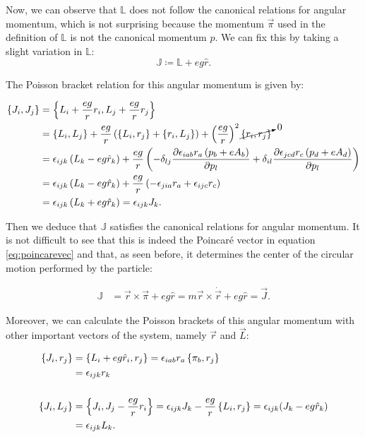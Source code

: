 Now, we can observe that $\mathbb{L}$ does not follow the canonical relations for angular momentum, which is not surprising because the momentum $\vec{\pi}$ used in the definition of $\mathbb{L}$ is not the canonical momentum $p$. We can fix this by taking a slight variation in $\mathbb{L}$:\\

\begin{equation}
\mathbb{J} \coloneqq \mathbb{L} + eg\hat{r}.
\label{eq:ham poincarevec}
\end{equation}

The Poisson bracket relation for this angular momentum is given by:

\begin{align*}
\left\lbrace J_i, J_j \right\rbrace &= \left\lbrace L_i + \frac{eg}{r}r_i, L_j + \frac{eg}{r}r_j \right\rbrace\\
&= \left\lbrace L_i, L_j \right\rbrace + \frac{eg}{r}\left( \left\lbrace L_i, r_j \right\rbrace +\left\lbrace r_i, L_j \right\rbrace \right) + \left( \frac{eg}{r} \right)^2\cancelto{0}{\left\lbrace r_i, r_j \right\rbrace}\\
& = \epsilon_{ijk}\left( L_k-{eg}\hat{r}_k \right)+\frac{eg}{r}\left( -\delta_{lj}\frac{\partial \epsilon_{iab}r_a\left( p_b+eA_b \right)}{\partial p_l}+ \delta_{il}\frac{\partial\epsilon_{jcd}r_c\left( p_d+eA_d \right)}{\partial p_l} \right)\\
& = \epsilon_{ijk}\left( L_k-{eg}\hat{r}_k \right)+ \frac{eg}{r}\left( -\epsilon_{jia}r_a+\epsilon_{ijc}r_c \right)\\
&= \epsilon_{ijk}\left( L_k+{eg}\hat{r}_k \right) = \epsilon_{ijk}J_k.
\end{align*}

Then we deduce that $\mathbb{J}$ satisfies the canonical relations for angular momentum. It is not difficult to see that this is indeed the Poincar\'e vector in equation \eqref{eq:poincarevec} and that, as seen before, it determines the center of the circular motion performed by the particle:

\begin{align*}
\mathbb{J} &= \vec{r}\times\vec{\pi}+{eg}\hat{r} = m{\vec{r}}\times\dot{\vec{r}} + eg\hat{r} = \vec{J}.
\end{align*}

Moreover, we can calculate the Poisson brackets of this angular momentum with other important vectors of the system, namely $\vec{r}$ and $\vec{L}$:

\begin{align*}
\left\lbrace J_i, r_j \right\rbrace &= \left\lbrace L_i+eg\hat{r}_i, r_j \right\rbrace =  \epsilon_{iab}r_a\left\lbrace \pi_b, r_j \right\rbrace \\
&= \epsilon_{ijk}r_k\\
\\
\left\lbrace J_i, L_j \right\rbrace &= \left\lbrace J_i, J_j-\frac{eg}{r}r_i \right\rbrace = \epsilon_{ijk}J_k-\frac{eg}{r}\left\lbrace L_i, r_j \right\rbrace =\epsilon_{ijk}(J_k-eg\hat{r}_k) \\
&= \epsilon_{ijk}L_k.
\end{align*}


